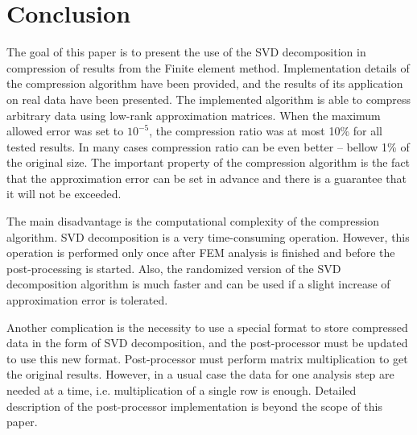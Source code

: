 \section{Conclusion}
\label{sec:conclusion}

The goal of this paper is to present the use of the SVD decomposition in compression of results from the Finite element method. Implementation details of the compression algorithm have been provided, and the results of its application on real data have been presented. The implemented algorithm is able to compress arbitrary data using low-rank approximation matrices. When the maximum allowed error was set to $10^{-5}$, the compression ratio was at most 10\% for all tested results. In many cases compression ratio can be even better -- bellow 1\% of the original size. The important property of the compression algorithm is the fact that the approximation error can be set in advance and there is a guarantee that it will not be exceeded.

The main disadvantage is the computational complexity of the compression algorithm. SVD decomposition is a very time-consuming operation. However, this operation is performed only once after FEM analysis is finished and before the post-processing is started. Also, the randomized version of the SVD decomposition algorithm is much faster and can be used if a slight increase of approximation error is tolerated.

Another complication is the necessity to use a special format to store compressed data in the form of SVD decomposition, and the post-processor must be updated to use this new format. Post-processor must perform matrix multiplication to get the original results. However, in a usual case the data for one analysis step are needed at a time, i.e. multiplication of a single row is enough. Detailed description of the post-processor implementation is beyond the scope of this paper.
